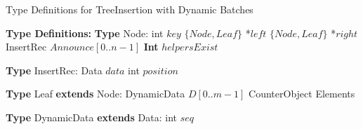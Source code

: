 \documentclass[a4paper,11pt,twoside,openany]{book}
\begin{document}
\begin{algorithm}[t]
    \footnotesize
    \caption{Type Definitions for TreeInsertion with Dynamic Batches}
    \label{alg:tree-types-dynamic}
    \begin{algorithmic}[1]
        \Statex \textbf{Type Definitions:}
        \State \textbf{Type} Node:
        \State \quad int $\mathit{key}$
        \State \quad $\{Node,Leaf\}$ *$\mathit{left}$
        \State \quad $\{Node,Leaf\}$ *$\mathit{right}$
        \State \quad InsertRec $\mathit{Announce}[0..n-1]$
        \State \quad \textbf{Int} $\mathit{helpersExist}$

        \Statex
        \State \textbf{Type} InsertRec:
        \State \quad Data $\mathit{data}$
        \State \quad int $\mathit{position}$

        \Statex
        \State \textbf{Type} Leaf \textbf{extends} Node:
        \State \quad DynamicData $D[0..m-1]$
        \State \quad CounterObject Elements

        \Statex
        \State \textbf{Type} DynamicData \textbf{extends} Data:
        \State \quad int $\mathit{seq}$

    \end{algorithmic}
\end{algorithm}
\end{document}
